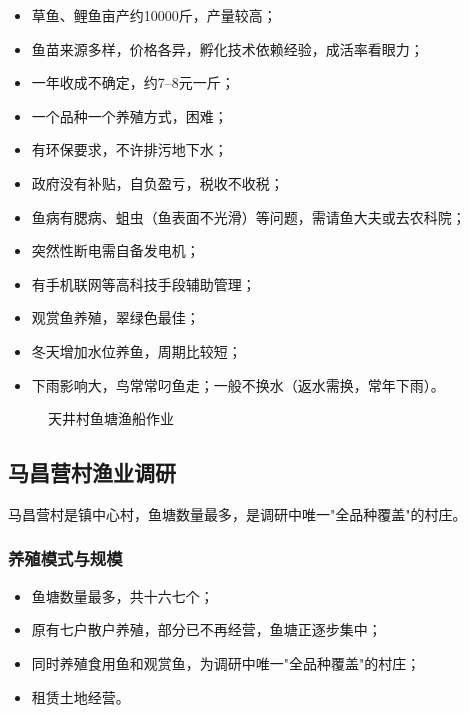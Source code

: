 \documentclass[12pt,a4paper]{article}
\begin{document}
\begin{itemize}[leftmargin=2em]
    \item 草鱼、鲤鱼亩产约10000斤，产量较高；
    \item 鱼苗来源多样，价格各异，孵化技术依赖经验，成活率看眼力；
    \item 一年收成不确定，约7--8元一斤；
    \item 一个品种一个养殖方式，困难；
    \item 有环保要求，不许排污地下水；
    \item 政府没有补贴，自负盈亏，税收不收税；
    \item 鱼病有腮病、蛆虫（鱼表面不光滑）等问题，需请鱼大夫或去农科院；
    \item 突然性断电需自备发电机；
    \item 有手机联网等高科技手段辅助管理；
    \item 观赏鱼养殖，翠绿色最佳；
    \item 冬天增加水位养鱼，周期比较短；
    \item 下雨影响大，鸟常常叼鱼走；一般不换水（返水需换，常年下雨）。
\end{itemize}

\begin{figure}[H]
\centering
{}
\caption{天井村鱼塘渔船作业}
\end{figure}

\subsection{马昌营村渔业调研}

马昌营村是镇中心村，鱼塘数量最多，是调研中唯一"全品种覆盖"的村庄。

\subsubsection{养殖模式与规模}

\begin{itemize}[leftmargin=2em]
    \item 鱼塘数量最多，共十六七个；
    \item 原有七户散户养殖，部分已不再经营，鱼塘正逐步集中；
    \item 同时养殖食用鱼和观赏鱼，为调研中唯一"全品种覆盖"的村庄；
    \item 租赁土地经营。
\end{itemize}
\end{document}
